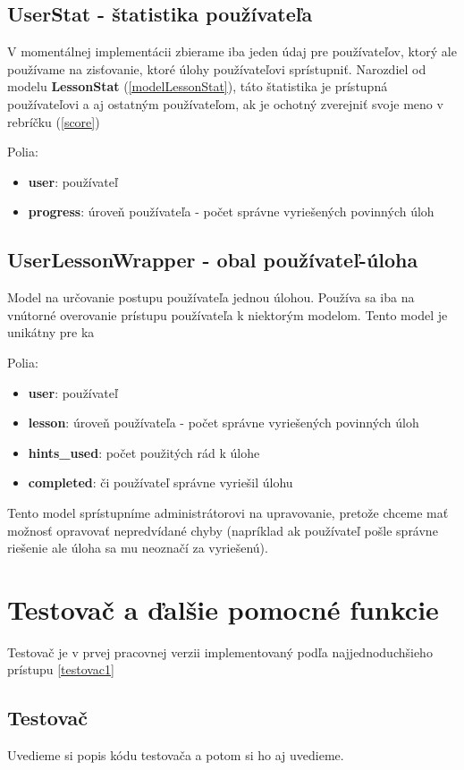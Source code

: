 \subsection{UserStat - štatistika používateľa}
\label{modelUserStat}
V momentálnej implementácii zbierame iba jeden údaj pre používateľov, ktorý ale používame
na zisťovanie, ktoré úlohy používateľovi sprístupniť. Narozdiel od modelu \textbf{LessonStat} (\ref{modelLessonStat}),
táto štatistika je prístupná používateľovi a aj ostatným používateľom, ak je ochotný zverejniť svoje
meno v rebríčku (\ref{score})

Polia:
\begin{itemize}
\item \textbf{user}: používateľ
\item \textbf{progress}: úroveň používateľa - počet správne vyriešených povinných úloh
\end{itemize}

\subsection{UserLessonWrapper - obal používateľ-úloha}
\label{modelWrapper}
Model na určovanie postupu používateľa jednou úlohou. Používa sa iba na vnútorné
overovanie prístupu používateľa k niektorým modelom. Tento model je unikátny pre ka



Polia:
\begin{itemize}
\item \textbf{user}: používateľ
\item \textbf{lesson}: úroveň používateľa - počet správne vyriešených povinných úloh
\item \textbf{hints\_used}: počet použitých rád k úlohe
\item \textbf{completed}: či používateľ správne vyriešil úlohu
\end{itemize}

Tento model sprístupníme administrátorovi na upravovanie, pretože chceme mať možnosť
opravovať nepredvídané chyby (napríklad ak používateľ pošle správne riešenie ale
úloha sa mu neoznačí za vyriešenú).

\protect\section{Testovač a ďalšie pomocné funkcie}
Testovač je v prvej pracovnej verzii implementovaný podľa najjednoduchšieho prístupu \ref{testovac1}
\subsection{Testovač}
Uvedieme si popis kódu testovača a potom si ho aj uvedieme.

